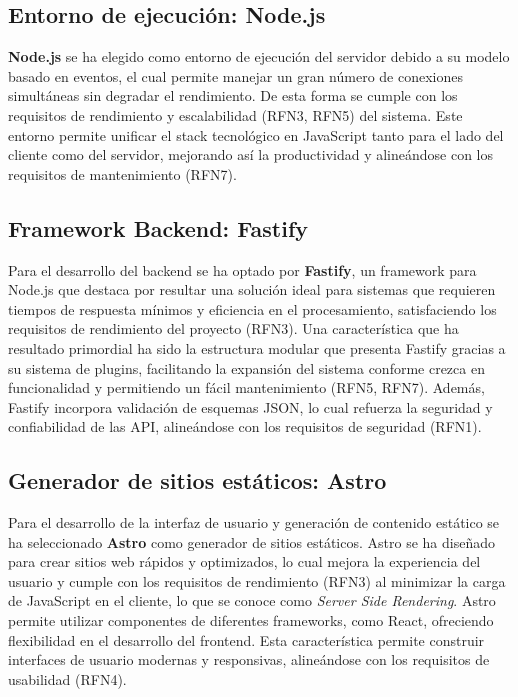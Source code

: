 \subsection{Entorno de ejecución: Node.js}

\textbf{Node.js} se ha elegido como entorno de ejecución del servidor debido a su modelo basado en eventos, el cual permite manejar un gran número de conexiones simultáneas sin degradar el rendimiento. De esta forma se cumple con los requisitos de rendimiento y escalabilidad (RFN3, RFN5) del sistema. Este entorno permite unificar el stack tecnológico en JavaScript tanto para el lado del cliente como del servidor, mejorando así la productividad y alineándose con los requisitos de mantenimiento (RFN7).

\subsection{Framework Backend: Fastify}

Para el desarrollo del backend se ha optado por \textbf{Fastify}, un framework para Node.js que destaca por resultar una solución ideal para sistemas que requieren tiempos de respuesta mínimos y eficiencia en el procesamiento, satisfaciendo los requisitos de rendimiento del proyecto (RFN3). Una característica que ha resultado primordial ha sido la estructura modular que presenta Fastify gracias a su sistema de plugins, facilitando la expansión del sistema conforme crezca en funcionalidad y permitiendo un fácil mantenimiento (RFN5, RFN7). Además, Fastify incorpora validación de esquemas JSON, lo cual refuerza la seguridad y confiabilidad de las API, alineándose con los requisitos de seguridad (RFN1).

\subsection{Generador de sitios estáticos: Astro}

Para el desarrollo de la interfaz de usuario y generación de contenido estático se ha seleccionado \textbf{Astro} como generador de sitios estáticos. Astro se ha diseñado para crear sitios web rápidos y optimizados, lo cual mejora la experiencia del usuario y cumple con los requisitos de rendimiento (RFN3) al minimizar la carga de JavaScript en el cliente, lo que se conoce como \textit{Server Side Rendering}. Astro permite utilizar componentes de diferentes frameworks, como React, ofreciendo flexibilidad en el desarrollo del frontend. Esta característica permite construir interfaces de usuario modernas y responsivas, alineándose con los requisitos de usabilidad (RFN4).


